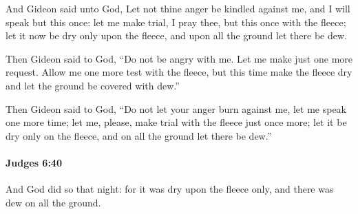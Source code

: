			\begin{versebox}
					\item[BHS] 
					\item[ASV] And Gideon said unto God, Let not thine anger be kindled against me, and I will speak but this once: let me make trial, I pray thee, but this once with the fleece; let it now be dry only upon the fleece, and upon all the ground let there be dew.
					\item[NIV] Then Gideon said to God, “Do not be angry with me. Let me make just one more request. Allow me one more test with the fleece, but this time make the fleece dry and let the ground be covered with dew.”
					\item[NRSV] Then Gideon said to God, “Do not let your anger burn against me, let me speak one more time; let me, please, make trial with the fleece just once more; let it be dry only on the fleece, and on all the ground let there be dew.”
			\end{versebox}

		\paragraph{Judges 6:40} %
			\label{JUDGES-6-40}

			And God did so that night: for it was dry upon the fleece only, and there was dew on all the ground.

